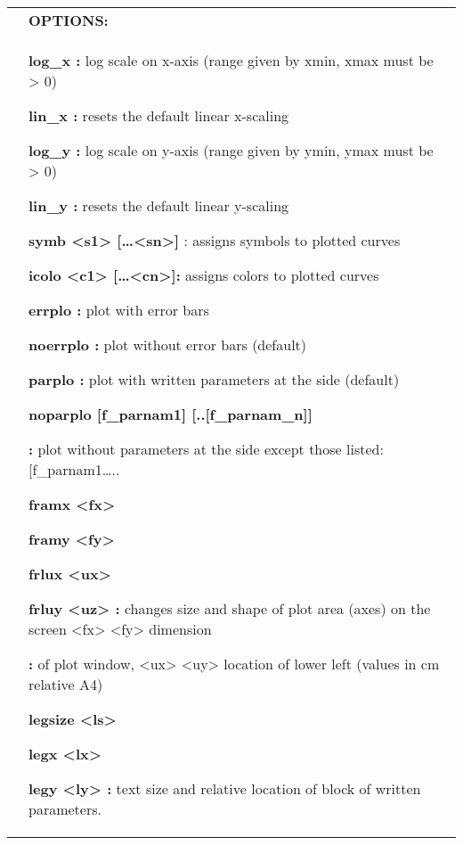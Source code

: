 \documentclass[]{article}
\begin{document}
\begin{longtable}[]{@{}ll@{}}
\toprule
\endhead
& \textbf{OPTIONS: }\tabularnewline
\begin{minipage}[t]{0.47\columnwidth}\raggedright
\strut
\end{minipage} & \begin{minipage}[t]{0.47\columnwidth}\raggedright
\textbf{log\_x :} log scale on x-axis (range given by xmin, xmax must be
\textgreater{} 0)

\textbf{lin\_x :} resets the default linear x-scaling

\textbf{log\_y :} log scale on y-axis (range given by ymin, ymax must be
\textgreater{} 0)

\textbf{lin\_y :} resets the default linear y-scaling

\textbf{symb \textless{}s1\textgreater{}
{[}\ldots{}\textless{}sn\textgreater{}{]}} : assigns symbols to plotted
curves

\textbf{icolo \textless{}c1\textgreater{}
{[}\ldots{}\textless{}cn\textgreater{}{]}:} assigns colors to plotted
curves

\textbf{errplo :} plot with error bars

\textbf{noerrplo :} plot without error bars (default)

\textbf{parplo :} plot with written parameters at the side (default)

\textbf{noparplo {[}f\_parnam1{]} {[}..{[}f\_parnam\_n{]}{]}}

\textbf{:} plot without parameters at the side except those listed:
{[}f\_parnam1\ldots{}..

\textbf{framx \textless{}fx\textgreater{} }

\textbf{framy \textless{}fy\textgreater{}}

\textbf{frlux \textless{}ux\textgreater{}}

\textbf{frluy \textless{}uz\textgreater{} :} changes size and shape of
plot area (axes) on the screen \textless{}fx\textgreater{}
\textless{}fy\textgreater{} dimension

\textbf{:} of plot window, \textless{}ux\textgreater{}
\textless{}uy\textgreater{} location of lower left (values in cm
relative A4)

\textbf{legsize \textless{}ls\textgreater{}}

\textbf{legx \textless{}lx\textgreater{}}

\textbf{legy \textless{}ly\textgreater{} :} text size and relative
location of block of written parameters.


\end{minipage}
\end{longtable}
\end{document}
